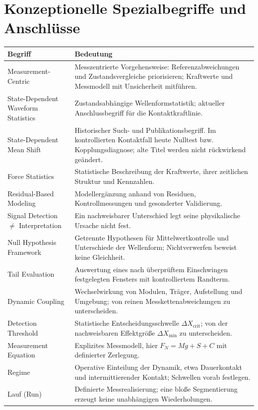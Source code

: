 \documentclass[11pt,a4paper]{article}
\begin{document}
\section{Konzeptionelle Spezialbegriffe und Anschlüsse}
\begin{longtable}{@{}L{.29\textwidth}L{.68\textwidth}@{}}
\toprule\textbf{Begriff}&\textbf{Bedeutung}\\\midrule\endhead
Measurement-Centric&Messzentrierte Vorgehensweise: Referenzabweichungen und Zustandsvergleiche priorisieren; Kraftwerte und Messmodell mit Unsicherheit mitführen.\\
State-Dependent Waveform Statistics&Zustandsabhängige Wellenformstatistik; aktueller Anschlussbegriff für die Kontaktkraftlinie.\\
State-Dependent Mean Shift&Historischer Such- und Publikationsbegriff. Im kontrollierten Kontaktfall heute Nulltest bzw. Kopplungsdiagnose; alte Titel werden nicht rückwirkend geändert.\\
Force Statistics&Statistische Beschreibung der Kraftwerte, ihrer zeitlichen Struktur und Kennzahlen.\\
Residual-Based Modeling&Modellergänzung anhand von Residuen, Kontrollmessungen und gesonderter Validierung.\\
Signal Detection $\ne$ Interpretation&Ein nachweisbarer Unterschied legt seine physikalische Ursache nicht fest.\\
Null Hypothesis Framework&Getrennte Hypothesen für Mittelwertkontrolle und Unterschiede der Wellenform; Nichtverwerfen beweist keine Gleichheit.\\
Tail Evaluation&Auswertung eines nach überprüftem Einschwingen festgelegten Fensters mit kontrolliertem Randterm.\\
Dynamic Coupling&Wechselwirkung von Modulen, Träger, Aufstellung und Umgebung; von reinen Messkettenabweichungen zu unterscheiden.\\
Detection Threshold&Statistische Entscheidungsschwelle $\Delta X_{\mathrm{crit}}$; von der nachweisbaren Effektgröße $\Delta X_{\min}$ zu unterscheiden.\\
Measurement Equation&Explizites Messmodell, hier $F_N=Mg+S+C$ mit definierter Zerlegung.\\
Regime&Operative Einteilung der Dynamik, etwa Dauerkontakt und intermittierender Kontakt; Schwellen vorab festlegen.\\
Lauf (Run)&Definierte Messrealisierung; eine bloße Segmentierung erzeugt keine unabhängigen Wiederholungen.\\

\end{longtable}
\end{document}
